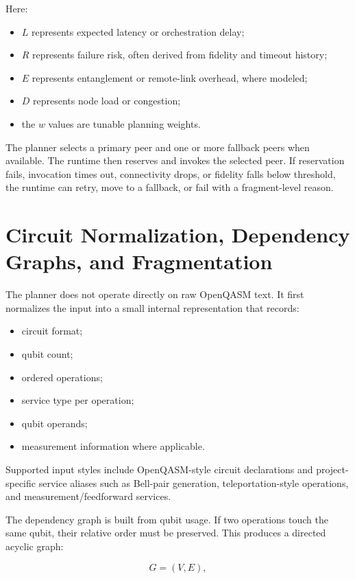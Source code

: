 \documentclass[11pt]{article}
\begin{document}
Here:

\begin{itemize}
\item \(L\) represents expected latency or orchestration delay;
\item \(R\) represents failure risk, often derived from fidelity and timeout history;
\item \(E\) represents entanglement or remote-link overhead, where modeled;
\item \(D\) represents node load or congestion;
\item the \(w\) values are tunable planning weights.
\end{itemize}

The planner selects a primary peer and one or more fallback peers when available. The runtime then reserves and invokes the selected peer. If reservation fails, invocation times out, connectivity drops, or fidelity falls below threshold, the runtime can retry, move to a fallback, or fail with a fragment-level reason.

\section{Circuit Normalization, Dependency Graphs, and Fragmentation}

The planner does not operate directly on raw OpenQASM text. It first normalizes the input into a small internal representation that records:

\begin{itemize}
\item circuit format;
\item qubit count;
\item ordered operations;
\item service type per operation;
\item qubit operands;
\item measurement information where applicable.
\end{itemize}

Supported input styles include OpenQASM-style circuit declarations and project-specific service aliases such as Bell-pair generation, teleportation-style operations, and measurement/feedforward services.

The dependency graph is built from qubit usage. If two operations touch the same qubit, their relative order must be preserved. This produces a directed acyclic graph:

\[
G=(V,E),
\]
\end{document}
